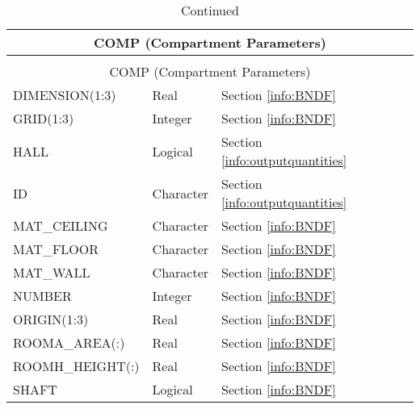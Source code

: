 \begin{longtable}{@{\extracolsep{\fill}}|l|l|l|l|l|}
\caption[Boundary file parameters ({\ct COMP} namelist group)]{For more information see Section~\ref{info:BNDF}.}
\label{tbl:COMP} \\
\hline
\multicolumn{5}{|c|}{{\ct COMP} (Compartment Parameters)} \\
\hline \hline
\endfirsthead
\caption[]{Continued} \\
\hline
\multicolumn{5}{|c|}{{\ct COMP} (Compartment Parameters)} \\
\hline \hline
\endhead
{\ct DIMENSION(1:3)}          & Real     & Section \ref{info:BNDF}                 &           &   \\ \hline
{\ct GRID(1:3)}        & Integer   & Section \ref{info:BNDF}                 &           &                 \\ \hline
{\ct HALL}          & Logical   & Section \ref{info:outputquantities}     &           &                 \\ \hline
{\ct ID}          & Character   & Section \ref{info:outputquantities}     &           &                 \\ \hline
{\ct MAT\_CEILING}        & Character   & Section \ref{info:BNDF}                 &           &                 \\ \hline
{\ct MAT\_FLOOR}        & Character   & Section \ref{info:BNDF}                 &           &                 \\ \hline
{\ct MAT\_WALL}        & Character   & Section \ref{info:BNDF}                 &           &                 \\ \hline
{\ct NUMBER}        & Integer   & Section \ref{info:BNDF}                 &           &                 \\ \hline
{\ct ORIGIN(1:3)}        & Real   & Section \ref{info:BNDF}                 &           &                 \\ \hline
{\ct ROOMA\_AREA(:)}        & Real   & Section \ref{info:BNDF}                 &           &                 \\ \hline
{\ct ROOMH\_HEIGHT(:)}        & Real   & Section \ref{info:BNDF}                 &           &                 \\ \hline
{\ct SHAFT}        & Logical   & Section \ref{info:BNDF}                 &           &                 \\ \hline
\end{longtable}

\vspace{\baselineskip}


